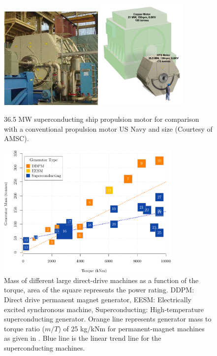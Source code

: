\documentclass[a4paper, 11pt]{article} %
\begin{document}
\begin{figure}[t]
    \centering
    \includegraphics[width=0.45\textwidth]{36MW_AMSC}
    \includegraphics[width=0.4\textwidth]{amsc_36mw_compare}
    \caption{36.5 MW superconducting ship propulsion motor for comparison with a conventional propulsion motor US Navy and size  (Courtesy of AMSC).} 
    \label{amsc_36mw}
\end{figure}

 \begin{figure}[t]
    \centering
    \includegraphics[width=0.8\textwidth]{generator_mass_compare}
\caption{Mass of different large direct-drive machines as a function of the torque, area of the square represents the power rating.
 DDPM: Direct drive permanent magnet generator, EESM: Electrically excited synchronous machine, Superconducting: High-temperature superconducting generator. Orange line represents generator mass to torque ratio ($m/T$) of 25 kg/kNm for permanent-magnet machines as given in \cite{Bang2008}. Blue line is the linear trend line for the superconducting machines.}
    \label{generator_mass_compare}
  \end{figure}
\end{document}
